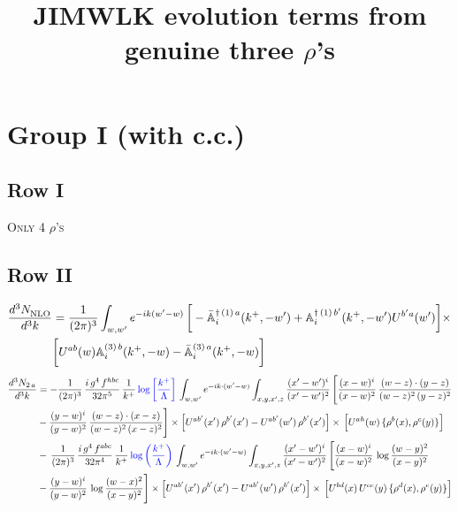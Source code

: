 \documentclass[9pt]{article}
\title{JIMWLK evolution terms from genuine three $\rho$'s}
\author{}
\date{}
\def\mf#1{\mathbb{#1}}
\numberwithin{equation}{section}
\begin{document}
\maketitle
\section{Group I (with c.c.)}
\subsection{Row I}
\textsc{Only 4 $\rho$'s}
\subsection{Row II}
\begin{align}
    \frac{d^{3}N_{\rm NLO}^{\rm}}{d^{3}k} &  = \frac{1}{(2\pi)^{3}}  \int_{w, w^\prime} e^{-ik(w^\prime-w)}\,\bigg[-\bar{\mf{A}}^{\dagger\,(1)\,a}_{i}(k^{+},-w^{\prime})+\mf{A}^{\dagger\, (1)\, b^{\prime}}_{i}(k^{+},-w^{\prime})U^{b^{\prime}a}(w^{\prime})\bigg]\times \notag \\ & \bigg[U^{ab}(w)\mf{A}^{(3)\, b}_{i}(k^{+},- w)-\Bar{\mf{A}}^{(3)\, a}_{i}(k^{+}, - w)\bigg]\nonumber
\end{align}
\begin{align}
    \frac{d^{3}N_{2\,a}}{d^{3}k} & = -\frac{1}{(2\pi)^{3}}\,\frac{i\,g^{4}\,f^{hbc}}{32\pi^{5}}\,\frac{1}{k^{+}}\,{\color{blue}\log{\left[\frac{k^{+}}{\Lambda}\right]}}\,
\int_{w,w'} e^{-ik\cdot(w'-w)}\int_{x,y,x',z}\frac{(x'-w')^{i}}{(x'-w')^{2}}\,\Bigg[\frac{(x-w)^{i}}{(x-w)^{2}}\, \frac{(w-z)\cdot (y-z)}{(w-z)^{2}\,(y-z)^{2}}\notag \\ & - \frac{(y-w)^{i}}{(y-w)^{2}}\, \frac{(w-z)\cdot (x-z)}{(w-z)^{2}\,(x-z)^{2}}\Bigg]\times\Big[U^{ab'}(x')\,\rho^{b'}(x')-U^{ab'}(w')\,\rho^{b'}(x')\Big]\times\, \Big[U^{ah}(w)\,\{\rho^{b}(x),\rho^{c}(y)\}\Big]\notag \\ &  -\,\frac{1}{(2\pi)^{3}}\,\frac{i\,g^{4}\,f^{abc}}{32\pi^{4}}\,\frac{1}{k^{+}}\,{\color{blue}\log\left(\frac{k^{+}}{\Lambda}\right)}\,
\int_{w,w'} e^{-ik\cdot(w'-w)}\int_{x,y,x',z}\frac{(x'-w')^{i}}{(x'-w')^{2}}\,\Bigg[\frac{(x-w)^{i}}{(x-w)^{2}}\,\log\frac{(w-y)^{2}}{(x-y)^{2}}\notag \\ & -\frac{(y-w)^{i}}{(y-w)^{2}}\,\log\frac{(w-x)^{2}}{(x-y)^{2}}\Bigg]\times \Big[U^{ab'}(x')\,\rho^{b'}(x')-U^{ab'}(w')\,\rho^{b'}(x')\Big]\times\, \Big[U^{bd}(x)\,U^{ce}(y)\,\{\rho^{d}(x),\rho^{e}(y)\}\Big]
\end{align}
\end{document}
